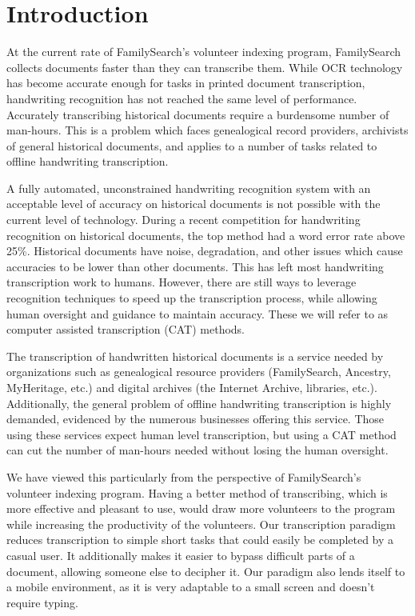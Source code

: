 \documentclass[ms]{byuprop}
\title{\Title}
\author{\Author}
\begin{document}
\maketitle

\section{Introduction}
At the current rate of FamilySearch's volunteer indexing program, FamilySearch collects documents faster than they can transcribe them. While OCR technology has become accurate enough for tasks in printed document transcription, handwriting recognition has not reached the same level of performance. Accurately transcribing historical documents require a burdensome number of man-hours. This is a problem which faces genealogical record providers, archivists of general historical documents, and applies to a number of tasks related to offline handwriting transcription.

A fully automated, unconstrained handwriting recognition system with an acceptable level of accuracy on historical documents is not possible with the current level of technology. During a recent competition for handwriting recognition on historical documents, the top method had a word error rate above 25\%\cite{icdarComp2015}.  Historical documents have noise, degradation, and other issues which cause accuracies to be lower than other documents. This has left most handwriting transcription work to humans. However, there are still ways to leverage recognition techniques to speed up the transcription process, while allowing human oversight and guidance to maintain accuracy. These we will refer to as computer assisted transcription (CAT) methods.

The transcription of handwritten historical documents is a service needed by organizations such as genealogical resource providers (FamilySearch, Ancestry, MyHeritage, etc.) and digital archives (the Internet Archive, libraries, etc.). Additionally, the general problem of offline handwriting transcription is highly demanded, evidenced by the numerous businesses offering this service. Those using these services expect human level transcription, but using a CAT method can cut the number of man-hours needed without losing the human oversight.

We have viewed this particularly from the perspective of FamilySearch's volunteer indexing program. Having a better method of transcribing, which is more effective and pleasant to use, would  draw more volunteers to the program while increasing the productivity of the volunteers. Our transcription paradigm reduces transcription to simple short tasks that could easily be completed by a casual user. It additionally makes it easier to bypass difficult parts of a document, allowing someone else to decipher it. Our paradigm also lends itself to a mobile environment, as it is very adaptable to a small screen and doesn't require typing.
\end{document}
